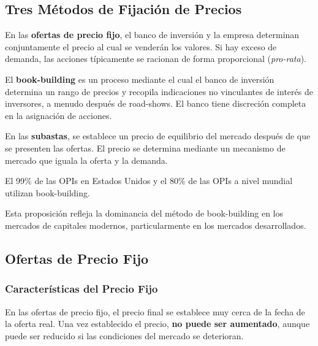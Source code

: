 \subsection{Tres Métodos de Fijación de Precios}

\begin{definicion}
En las \textbf{ofertas de precio fijo}, el banco de inversión y la empresa determinan conjuntamente el precio al cual se venderán los valores. Si hay exceso de demanda, las acciones típicamente se racionan de forma proporcional (\textit{pro-rata}).
\end{definicion}

\begin{definicion}
El \textbf{book-building} es un proceso mediante el cual el banco de inversión determina un rango de precios y recopila indicaciones no vinculantes de interés de inversores, a menudo después de road-shows. El banco tiene discreción completa en la asignación de acciones.
\end{definicion}

\begin{definicion}[Subastas]
En las \textbf{subastas}, se establece un precio de equilibrio del mercado después de que se presenten las ofertas. El precio se determina mediante un mecanismo de mercado que iguala la oferta y la demanda.
\end{definicion}

\begin{proposicion}
El 99\% de las OPIs en Estados Unidos y el 80\% de las OPIs a nivel mundial utilizan book-building.
\end{proposicion}

Esta proposición refleja la dominancia del método de book-building en los mercados de capitales modernos, particularmente en los mercados desarrollados.

\subsection{Ofertas de Precio Fijo}

\subsubsection{Características del Precio Fijo}

En las ofertas de precio fijo, el precio final se establece muy cerca de la fecha de la oferta real. Una vez establecido el precio, \textbf{no puede ser aumentado}, aunque puede ser reducido si las condiciones del mercado se deterioran.

